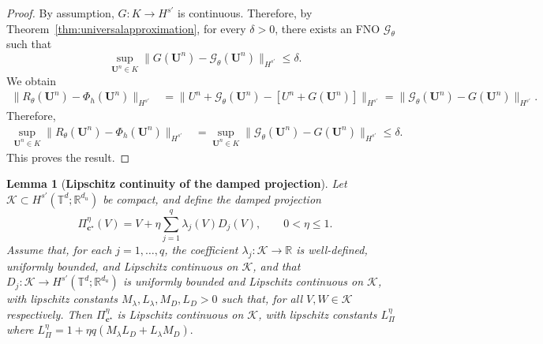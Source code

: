 \documentclass[11pt,a4paper]{article}
\newtheorem{lemma}[theorem]{Lemma}
\theoremstyle{definition}
\theoremstyle{remark}
\numberwithin{equation}{section}
\numberwithin{figure}{section}
\numberwithin{table}{section}
\begin{document}
\begin{proof}
By assumption, \(G:K\to H^{s'}\) is continuous. Therefore, by
Theorem~\ref{thm:universalapproximation}, for every \(\delta>0\), there exists
an FNO \(\mathcal G_\theta\) such that
\[
    \sup_{\mathbf U^n\in K}
    \|G(\mathbf U^n)-\mathcal G_\theta(\mathbf U^n)\|_{H^{s'}}
    \le \delta .
\]
We obtain
\[
\begin{aligned}
    \|R_\theta(\mathbf U^n)-\Phi_h(\mathbf U^n)\|_{H^{s'}}
    &=
    \|U^n+\mathcal G_\theta(\mathbf U^n)
    -[U^n+G(\mathbf U^n)]\|_{H^{s'}}  =
    \|\mathcal G_\theta(\mathbf U^n)-G(\mathbf U^n)\|_{H^{s'}} .
\end{aligned}
\]
Therefore,
\[
\begin{aligned}
    \sup_{\mathbf U^n\in K}
    \|R_\theta(\mathbf U^n)-\Phi_h(\mathbf U^n)\|_{H^{s'}}
    &=
    \sup_{\mathbf U^n\in K}
    \|\mathcal G_\theta(\mathbf U^n)-G(\mathbf U^n)\|_{H^{s'}} \le \delta .
\end{aligned}
\]
This proves the result.
\end{proof}


\begin{lemma}[\textbf{Lipschitz continuity of the damped projection}]
\label{lem:projection_lipschitz}
Let \(\mathcal K\subset H^{s'}(\mathbb T^d;\mathbb R^{d_u})\) be compact, and define the damped projection
\[
    \Pi_{\mathbf c^\star}^{\eta}(V)
    =
    V+\eta\sum_{j=1}^{q}\lambda_j(V)D_j(V),
    \qquad 0<\eta\le 1 .
\]
Assume that, for each \(j=1,\ldots,q\), the coefficient \(\lambda_j:\mathcal K\to\mathbb R\) is well-defined, uniformly bounded, and Lipschitz continuous on \(\mathcal K\), and that \(D_j:\mathcal K\to H^{s'}(\mathbb T^d;\mathbb R^{d_u})\) is uniformly bounded and Lipschitz continuous on \(\mathcal K\), with lipschitz constants \(M_\lambda,L_\lambda,M_D,L_D>0\) such that, for all \(V,W\in\mathcal K\) respectively.
Then \(\Pi_{\mathbf c^\star}^{\eta}\) is Lipschitz continuous on \(\mathcal K\), with lipschitz constants $ L_\Pi^\eta$
where
$
    L_\Pi^\eta
    =
    1+\eta q(M_\lambda L_D+L_\lambda M_D).
$
\end{lemma}
\end{document}
